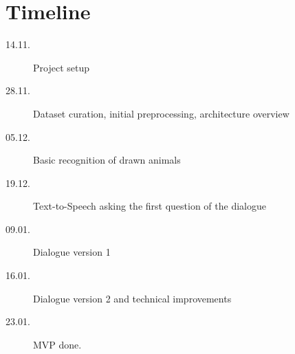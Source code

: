 \section{Timeline}
\begin{description}
\item[14.11.] Project setup
\item[28.11.] Dataset curation, initial preprocessing, architecture overview
\item[05.12.] Basic recognition of drawn animals
\item[19.12.] Text-to-Speech asking the first question of the dialogue
\item[09.01.] Dialogue version 1
\item[16.01.] Dialogue version 2 and technical improvements
\item[23.01.] MVP done.
\end{description}


